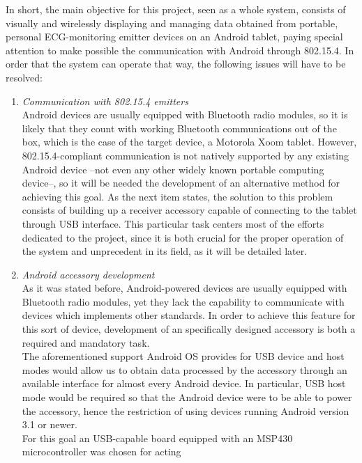		In short, the main objective for this project, seen as a whole system, consists of
		visually and wirelessly displaying and managing data obtained from portable, personal ECG-monitoring
		emitter devices on an Android tablet, paying special attention to make possible the communication
		with Android through 802.15.4. In order that the system can operate that way, the following 
		issues will have to be resolved:
		\begin{enumerate}
			\item \emph{Communication with 802.15.4 emitters}\\
				Android devices are usually equipped with Bluetooth radio modules, so it is likely that they 
				count with working Bluetooth communications out of the box, which is the case of the target
				device, a Motorola Xoom tablet.
				However, 802.15.4-compliant communication is not natively supported by any existing Android
				device --not even any other widely known portable computing device--, so it will be needed %
				the development of an alternative method for achieving this goal. As the next item states,
				the solution to this problem consists of building up a receiver accessory capable of connecting
				to the tablet through USB interface. This particular task centers most of the efforts dedicated
				to the project, since it is both crucial for the proper operation of the system and unprecedent
				in its field, as it will be detailed later.
			\item \emph{Android accessory development}\\
				As it was stated before, Android-powered devices are usually equipped with Bluetooth radio
				modules, yet they lack the capability to communicate with devices which implements other 
				standards. In order to achieve this feature for this sort of device, development of an
				specifically designed accessory is both a required and mandatory task.\\
				The aforementioned support Android OS provides for USB device and host modes would allow us to
				obtain data processed by the accessory through an available interface for almost every 
				Android device. In particular, USB host mode would be required so that the Android device 
				were to be able to power the accessory, hence the restriction of using devices running
				Android version 3.1 or newer.\\
				For this goal an USB-capable board equipped with an MSP430 microcontroller was chosen for acting

\end{enumerate}
